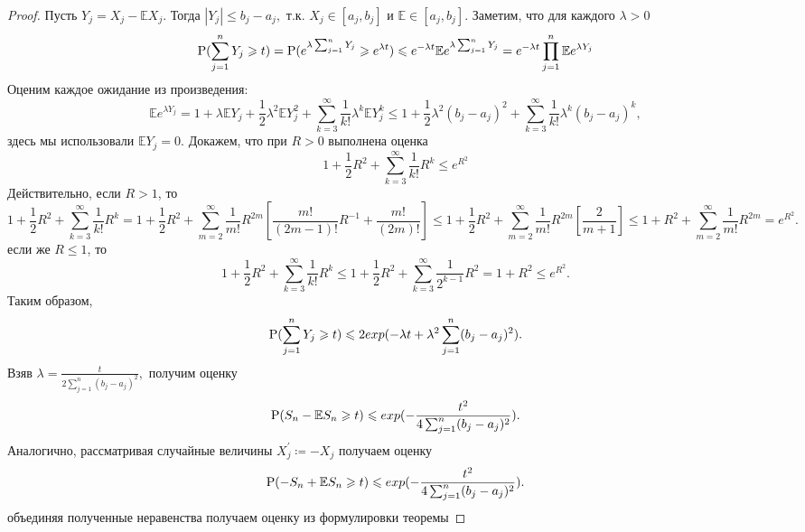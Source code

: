 \begin{proof}
    Пусть $Y_j = X_j - \mathbb{E}X_j.$ Тогда $|Y_j|\leq b_j - a_j,$ т.к. $X_j\in[a_j, b_j]$ и $\mathbb{E}\in[a_j, b_j].$ Заметим, что для каждого $\lambda > 0$
    \begin{equation*}
        \P(\sum\limits_{j=1}^{n}Y_j \geq t) = \P(e^{\lambda\sum_{j=1}^{n}Y_j} \geq e^{\lambda t}) \leq e^{-\lambda t}\mathbb{E}e^{\lambda\sum_{j=1}^{n} Y_j} = e^{-\lambda t}\prod_{j=1}^{n}\mathbb{E}e^{\lambda Y_j}
    \end{equation*}
    Оценим каждое ожидание из произведения:
    \begin{equation*}
        \mathbb{E}e^{\lambda Y_j} = 1 + \lambda\mathbb{E}Y_j + \frac{1}{2}\lambda^{2}\mathbb{E}Y_{j}^{2} + \sum\limits_{k = 3}^{\infty}\frac{1}{k!}\lambda^{k}\mathbb{E}Y_{j}^{k} \leq 1 + \frac{1}{2}\lambda^{2}(b_j - a_j)^{2} + \sum\limits_{k=3}^{\infty}\frac{1}{k!}\lambda^{k}(b_j - a_j)^{k}, 
    \end{equation*}
    здесь мы использовали $\mathbb{E}Y_j = 0.$ Докажем, что при $R > 0$ выполнена оценка
    \begin{equation*}
        1 + \frac{1}{2}R^2 + \sum\limits_{k=3}^{\infty}\frac{1}{k!}R^k \leq e^{R^2}
    \end{equation*}
    Действительно, если $R > 1$, то
    \begin{equation*}
        1 + \frac{1}{2}R^2 + \sum\limits_{k=3}^{\infty}\frac{1}{k!}R^k = 1 + \frac{1}{2}R^2 + \sum\limits_{m=2}^{\infty}\frac{1}{m!}R^{2m}[\frac{m!}{(2m - 1)!}R^{-1} + \frac{m!}{(2m)!}] \leq 1 + \frac{1}{2}R^2 + \sum\limits_{m=2}^{\infty}\frac{1}{m!}R^{2m}[\frac{2}{m + 1}] \leq 1 + R^2 + \sum\limits_{m=2}^{\infty}\frac{1}{m!}R^{2m} = e^{R^2}.
    \end{equation*}
    если же $R\leq 1$, то
    \begin{equation*}
        1 + \frac{1}{2}R^2 + \sum\limits_{k=3}^{\infty}\frac{1}{k!}R^k \leq 1 + \frac{1}{2}R^2+ \sum\limits_{k=3}^{\infty}\frac{1}{2^{k-1}}R^2 = 1 + R^2 \leq e^{R^2}.
    \end{equation*}
    Таким образом,
    \begin{equation*}
        \P(\sum\limits_{j=1}^{n}Y_j\geq t)\leq 2 exp(-\lambda t + \lambda^2\sum\limits_{j=1}^{n}(b_j - a_j)^2).
    \end{equation*}
    Взяв $\lambda = \frac{t}{2\sum_{j=1}^{n}(b_j - a_j)^2},$ получим оценку
    \begin{equation*}
        \P(S_n - \mathbb{E}S_n \geq t)\leq exp(-\frac{t^2}{4\sum_{j=1}^{n}(b_j - a_j)^2}).
    \end{equation*}
    Аналогично, рассматривая случайные величины $X_{j}^{'} \coloneq -X_j$ получаем оценку
    \begin{equation*}
        \P(-S_n + \mathbb{E}S_n \geq t) \leq exp(-\frac{t^2}{4\sum_{j=1}^{n}(b_j - a_j)^2}).
    \end{equation*}
    объединяя полученные неравенства получаем оценку из формулировки теоремы
\end{proof}

